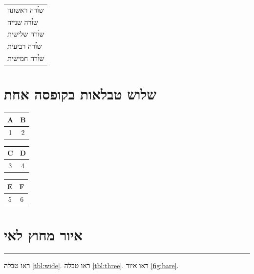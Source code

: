 \begin{tablebox}\centering\small
\begin{tabular}{@{}p{\dimexpr\linewidth+3pt\relax}@{}}
\toprule
\h{שורה ראשונה} \\
\h{שורה שנייה} \\
\h{שורה שלישית} \\
\h{שורה רביעית} \\
\h{שורה חמישית} \\
\bottomrule
\end{tabular}
\end{tablebox}

\section{שלוש טבלאות בקופסה אחת}
\begin{tablebox}\centering\small
\begin{otherlanguage}{english}
\begin{tabular}{|c|c|}\hline A & B \\ \hline 1 & 2 \\ \hline\end{tabular}

\smallskip
\begin{tabular}{|c|c|}\hline C & D \\ \hline 3 & 4 \\ \hline\end{tabular}

\smallskip
\begin{tabular}{|c|c|}\hline E & F \\ \hline 5 & 6 \\ \hline\end{tabular}
\end{otherlanguage}
\end{tablebox}

\section{איור מחוץ לאי}
\begin{center}
\rule{200pt}{160pt}
\end{center}

ראו טבלה \ref{tbl:wide}.
ראו טבלה \ref{tbl:three}.
ראו איור \ref{fig:bare}.

